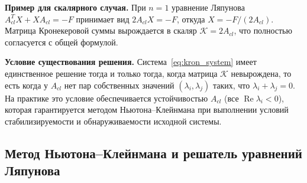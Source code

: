 \documentclass[12pt, a4paper, oneside]{extarticle}
\begin{document}
\textbf{Пример для скалярного случая.} При $n = 1$ уравнение Ляпунова
$A_{cl}^T X + X A_{cl} = -F$ принимает вид $2 A_{cl} X = -F$, откуда
$X = -F / (2 A_{cl})$. Матрица Кронекеровой суммы вырождается в скаляр
$\mathcal{K} = 2 A_{cl}$, что полностью согласуется с общей формулой.

\textbf{Условие существования решения.} Система~\eqref{eq:kron_system} имеет
единственное решение тогда и только тогда, когда матрица $\mathcal{K}$
невырождена, то есть когда у $A_{cl}$ нет пар собственных значений
$(\lambda_i, \lambda_j)$ таких, что $\lambda_i + \lambda_j = 0$. На практике
это условие обеспечивается устойчивостью $A_{cl}$ (все
$\operatorname{Re}\lambda_i < 0$), которая гарантируется методом
Ньютона--Клейнмана при выполнении условий стабилизируемости и обнаруживаемости
исходной системы.

\subsection{Метод Ньютона--Клейнмана и решатель уравнений Ляпунова}
\end{document}
